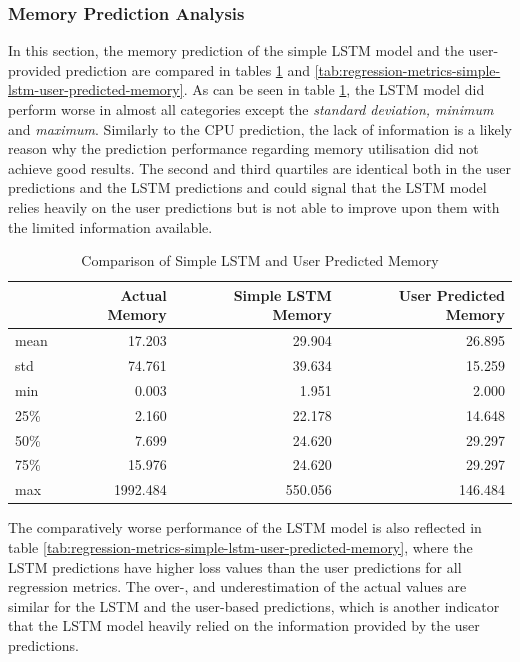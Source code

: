     \subsubsection{Memory Prediction Analysis}
    \label{sec:mem-prediction-analysis-simple-lstm-evaluation}

      In this section, the memory prediction of the simple LSTM model and the user-provided prediction are compared in tables \ref{tab:comparison-simple-lstm-user-predicted-memory} and \ref{tab:regression-metrics-simple-lstm-user-predicted-memory}.
      As can be seen in table \ref{tab:comparison-simple-lstm-user-predicted-memory}, the LSTM model did perform worse in almost all categories except the \emph{standard deviation, minimum} and \emph{maximum}.
      Similarly to the CPU prediction, the lack of information is a likely reason why the prediction performance regarding memory utilisation did not achieve good results. The second and third quartiles are identical both in the user predictions and the LSTM predictions and could signal that the LSTM model relies heavily on the user predictions but is not able to improve upon them with the limited information available.
      \begin{table}
        \centering
        \caption{Comparison of Simple LSTM and User Predicted Memory}
        \label{tab:comparison-simple-lstm-user-predicted-memory}

        \begin{tabular}{|l|rrr|}
          \toprule
          {} &  Actual Memory &  Simple LSTM Memory &  User Predicted Memory \\
          \midrule
          mean &            17.203 &               29.904 &         26.895 \\
          std  &            74.761 &               39.634 &         15.259 \\
          min  &             0.003 &                1.951 &          2.000 \\
          25\%  &             2.160 &               22.178 &         14.648 \\
          50\%  &             7.699 &               24.620 &         29.297 \\
          75\%  &            15.976 &               24.620 &         29.297 \\
          max  &          1992.484 &              550.056 &        146.484 \\
          \bottomrule
          \end{tabular}
      \end{table}
      The comparatively worse performance of the LSTM model is also reflected in table \ref{tab:regression-metrics-simple-lstm-user-predicted-memory}, where the LSTM predictions have higher loss values than the user predictions for all regression metrics.
      The over-, and underestimation of the actual values are similar for the LSTM and the user-based predictions, which is another indicator that the LSTM model heavily relied on the information provided by the user predictions.

